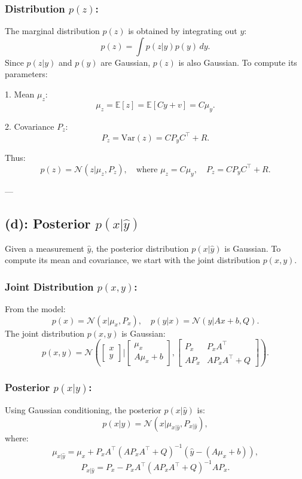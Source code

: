 \documentclass[12pt]{article}
\begin{document}
\subsubsection*{Distribution $p(z)$:}
The marginal distribution $p(z)$ is obtained by integrating out $y$:
\[
p(z) = \int p(z|y)p(y) \, dy.
\]
Since $p(z|y)$ and $p(y)$ are Gaussian, $p(z)$ is also Gaussian. To compute its parameters:

1. Mean $\mu_z$:
\[
\mu_z = \mathbb{E}[z] = \mathbb{E}[C y + v] = C \mu_y.
\]

2. Covariance $P_z$:
\[
P_z = \text{Var}(z) = C P_y C^\top + R.
\]

Thus:
\[
p(z) = \mathcal{N}(z | \mu_z, P_z), \quad \text{where } \mu_z = C \mu_y, \quad P_z = C P_y C^\top + R.
\]

---

\subsection*{(d): Posterior $p(x| \hat{y})$}
Given a measurement $\hat{y}$, the posterior distribution $p(x|\hat{y})$ is Gaussian. To compute its mean and covariance, we start with the joint distribution $p(x, y)$.

\subsubsection*{Joint Distribution $p(x, y)$:}
From the model:
\[
p(x) = \mathcal{N}(x | \mu_x, P_x), \quad p(y|x) = \mathcal{N}(y | A x + b, Q).
\]
The joint distribution $p(x, y)$ is Gaussian:
\[
p(x, y) = \mathcal{N} \left(
\begin{bmatrix}
x \\
y
\end{bmatrix}
\Bigg|
\begin{bmatrix}
\mu_x \\
A \mu_x + b
\end{bmatrix},
\begin{bmatrix}
P_x & P_x A^\top \\
A P_x & A P_x A^\top + Q
\end{bmatrix}
\right).
\]

\subsubsection*{Posterior $p(x|\hat{y})$:}
Using Gaussian conditioning, the posterior $p(x|\hat{y})$ is:
\[
p(x|\hat{y}) = \mathcal{N}(x | \mu_{x|\hat{y}}, P_{x|\hat{y}}),
\]
where:
\[
\mu_{x|\hat{y}} = \mu_x + P_x A^\top \left(A P_x A^\top + Q \right)^{-1} \left(\hat{y} - (A \mu_x + b)\right),
\]
\[
P_{x|\hat{y}} = P_x - P_x A^\top \left(A P_x A^\top + Q \right)^{-1} A P_x.
\]
\end{document}
